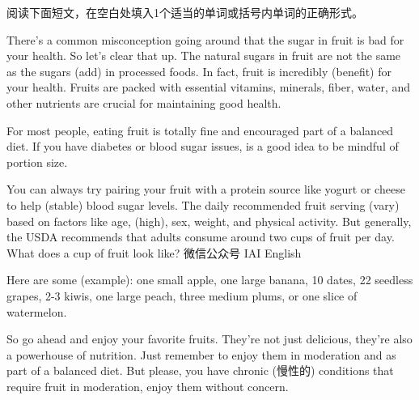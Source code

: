 \documentclass{英语试卷}
\begin{document}
\par 阅读下面短文，在空白处填入1个适当的单词或括号内单词的正确形式。\par
\par There's a common misconception going around that the sugar in fruit is bad for your health. So let's clear that up. The natural sugars in fruit are not the same as the sugars  (add) in processed foods. In fact, fruit is incredibly  (benefit) for your health. Fruits are packed with essential vitamins, minerals, fiber, water, and other nutrients  are crucial for maintaining good health.\par
\par For most people, eating fruit is totally fine and encouraged  part of a balanced diet. If you have diabetes or blood sugar issues,  is a good idea to be mindful of portion size.\par
\par You can always try pairing your fruit with a protein source like yogurt or cheese to help (stable) blood sugar levels. The daily recommended fruit serving (vary) based on factors like age, (high), sex, weight, and physical activity. But generally, the USDA recommends that adults consume around two cups of fruit per day. What does a cup of fruit look like? 微信公众号 IAI English\par
\par Here are some  (example): one small apple, one large banana, 10 dates, 22 seedless grapes, 2-3 kiwis, one large peach, three medium plums, or one slice of watermelon.\par
\par So go ahead and enjoy your favorite fruits. They're not just delicious, they're also a powerhouse of nutrition. Just remember to enjoy them in moderation and as part of a balanced diet. But please,  you have chronic (慢性的) conditions that require fruit in moderation, enjoy them without concern.\par
{}
\end{document}
